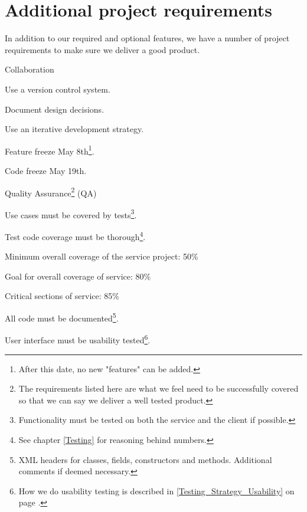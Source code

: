\section{Additional project requirements}
\label{Requirements_Additional}
In addition to our required and optional features, we have a number of project requirements to make sure we deliver a good product. 
\begin{my_itemize}
	\item Collaboration 
	\begin{my_itemize}
		\item Use a version control system.
		\item Document design decisions.
		\item Use an iterative development strategy.
 		\item Feature freeze May 8th\footnote{After this date, no new "features" can be added.}.
		\item Code freeze May 19th.
	\end{my_itemize}
	\item Quality Assurance\footnote{The requirements listed here are what we feel need to be successfully covered so that we can say we deliver a well tested product.} (QA)
	\begin{my_itemize}
		\item Use cases must be covered by tests\footnote{Functionality must be tested on both the service and the client if possible.}.
		\item Test code coverage must be thorough\footnote{See chapter \ref{Testing}  for reasoning behind	numbers.}.
		\begin{my_itemize}
			\item Minimum overall coverage of the service project: 50\%
			\item Goal for overall coverage of service: 80\%
			\item Critical sections of service: 85\%
		\end{my_itemize}
		\item All code must be documented\footnote{XML headers for classes, fields, constructors and methods. Additional comments if deemed necessary.}.
		\item User interface must be usability tested\footnote{How we do usability testing is described in \ref{Testing_Strategy_Usability} on page \pageref{Testing_Strategy_Usability}.}.
	\end{my_itemize}
\end{my_itemize}

